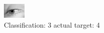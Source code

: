 \begin{figure}[h!]
\begin{center}
\includegraphics[width=0.60\columnwidth]{figures/ID3029_class_3_target_4.png}
\end{center}
\caption{ Classification: 3 actual target: 4}
\label{fig:ID3029_class_3_target_4}
\end{figure}
